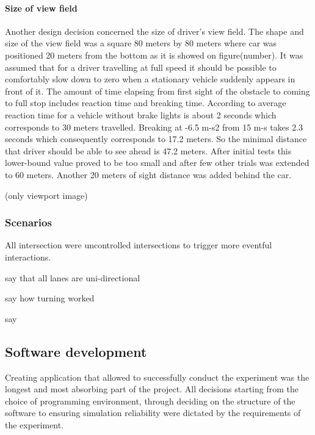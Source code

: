 \documentclass[11pt]{article}
\begin{document}
\paragraph{Size of view field}
Another design decision concerned the size of driver's view field. The shape and size of the view field was a square 80 meters by 80 meters where car was positioned 20 meters from the bottom as it is showed on figure(number). It was assumed that for a driver travelling at full speed it should be possible to comfortably slow down to zero when a stationary vehicle suddenly appears in front of it. The amount of time elapsing from first sight of the obstacle to coming to full stop includes reaction time and breaking time. According to \citep{summala1998driving} average reaction time for a vehicle without brake lights is about 2 seconds which corresponds to 30 meters travelled. Breaking at -6.5 m-s2 from 15 m-s takes 2.3 seconds which consequently corresponds to 17.2 meters. So the minimal distance that driver should be able to see ahead is 47.2 meters. After initial tests this lower-bound value proved to be too small and after few other trials was extended to 60 meters. Another 20 meters of sight distance was added behind the car. 

(only viewport image)





\subsubsection{Scenarios}


All intersection were uncontrolled intersections to trigger more eventful interactions. 

say that all lanes are uni-directional

say how turning worked

say 


\subsection{Software development}

Creating application that allowed to successfully conduct the experiment was the longest and most absorbing part of the project. All decisions starting from the choice of programming environment, through deciding on the structure of the software to ensuring simulation reliability were dictated by the requirements of the experiment.
\end{document}
